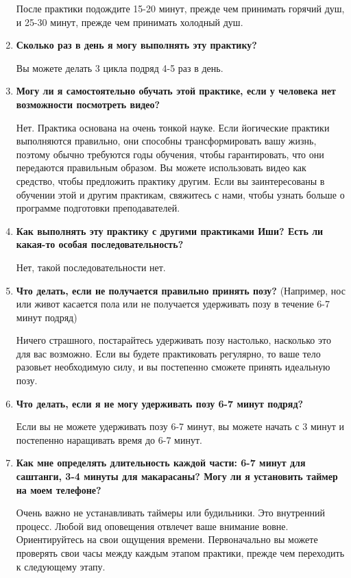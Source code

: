 \documentclass[
a4paper, %
12pt, %
article,
onecolumn, %
openany, %
]{memoir}
\begin{document}
\begin{enumerate}
После практики подождите 15-20 минут, прежде чем принимать горячий душ, и 25-30
минут, прежде чем принимать холодный душ.

\item \textbf{Сколько раз в день я могу выполнять эту практику?}

Вы можете делать 3 цикла подряд 4-5 раз в день.
\item \textbf{Могу ли я самостоятельно обучать этой практике, если у человека нет возможности посмотреть видео?}

Нет. Практика основана на очень тонкой науке. Если йогические практики выполняются
правильно, они способны трансформировать вашу жизнь, поэтому обычно требуются
годы обучения, чтобы гарантировать, что они передаются правильным образом. Вы
можете использовать видео как средство, чтобы предложить практику другим. Если вы
заинтересованы в обучении этой и другим практикам, свяжитесь с нами, чтобы узнать
больше о программе подготовки преподавателей.
\item \textbf{Как выполнять эту практику с другими практиками Иши? Есть ли какая-то особая последовательность?}

Нет, такой последовательности нет.
\item \textbf{Что делать, если не получается правильно принять позу?}
(Например, нос или живот касается пола или не получается удерживать позу в течение
6-7 минут подряд)

Ничего страшного, постарайтесь удерживать позу настолько, насколько это для вас
возможно. Если вы будете практиковать регулярно, то ваше тело разовьет
необходимую силу, и вы постепенно сможете принять идеальную позу.

\item \textbf{Что делать, если я не могу удерживать позу 6-7 минут подряд?}

Если вы не можете удерживать позу 6-7 минут, вы можете начать с 3 минут и
постепенно наращивать время до 6-7 минут.





\item \textbf{Как мне определять длительность каждой части: 6-7 минут для саштанги, 3-4 минуты для макарасаны? Могу ли я установить таймер на моем телефоне?}

Очень важно не устанавливать таймеры или будильники. Это внутренний процесс.
Любой вид оповещения отвлечет ваше внимание вовне. Ориентируйтесь на свои ощущения времени. Первоначально вы можете проверять свои часы между каждым этапом практики, прежде чем переходить к следующему этапу.


\end{enumerate}
\end{document}
